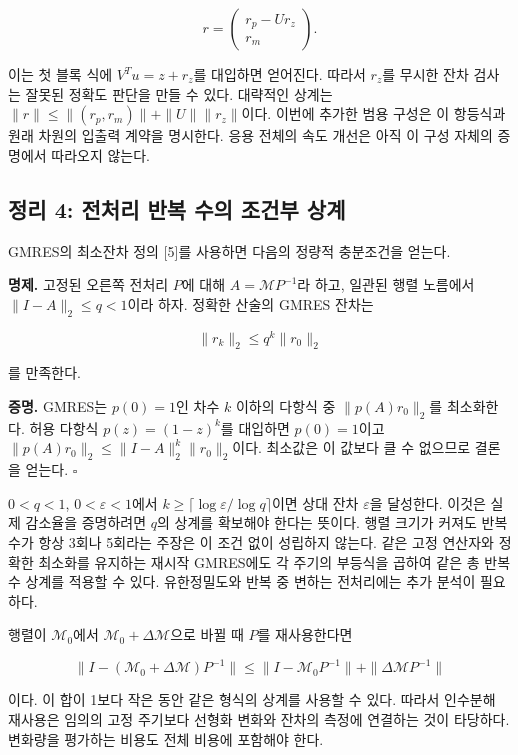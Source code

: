 \documentclass[
  10pt,
  a4paper,
]{article}
\begin{document}
\[
r=\begin{pmatrix}r_p-Ur_z\\r_m\end{pmatrix}.
\]

이는 첫 블록 식에 \(V^Tu=z+r_z\)를 대입하면 얻어진다. 따라서 \(r_z\)를
무시한 잔차 검사는 잘못된 정확도 판단을 만들 수 있다. 대략적인 상계는
\(\|r\|\le\|(r_p,r_m)\|+\|U\|\|r_z\|\)이다. 이번에 추가한 범용 구성은 이
항등식과 원래 차원의 입출력 계약을 명시한다. 응용 전체의 속도 개선은
아직 이 구성 자체의 증명에서 따라오지 않는다.

\hypertarget{uxc815uxb9ac-4-uxc804uxcc98uxb9ac-uxbc18uxbcf5-uxc218uxc758-uxc870uxac74uxbd80-uxc0c1uxacc4}{%
\subsection{정리 4: 전처리 반복 수의 조건부
상계}\label{uxc815uxb9ac-4-uxc804uxcc98uxb9ac-uxbc18uxbcf5-uxc218uxc758-uxc870uxac74uxbd80-uxc0c1uxacc4}}

GMRES의 최소잔차 정의 {[}5{]}를 사용하면 다음의 정량적 충분조건을
얻는다.

\textbf{명제.} 고정된 오른쪽 전처리 \(P\)에 대해
\(A=\mathcal MP^{-1}\)라 하고, 일관된 행렬 노름에서
\(\|I-A\|_2\le q<1\)이라 하자. 정확한 산술의 GMRES 잔차는

\[
\|r_k\|_2\le q^k\|r_0\|_2
\]

를 만족한다.

\textbf{증명.} GMRES는 \(p(0)=1\)인 차수 \(k\) 이하의 다항식 중
\(\|p(A)r_0\|_2\)를 최소화한다. 허용 다항식 \(p(z)=(1-z)^k\)를 대입하면
\(p(0)=1\)이고 \(\|p(A)r_0\|_2\le\|I-A\|_2^k\|r_0\|_2\)이다. 최소값은 이
값보다 클 수 없으므로 결론을 얻는다. \(\square\)

\(0<q<1\), \(0<\varepsilon<1\)에서
\(k\ge\lceil\log\varepsilon/\log q\rceil\)이면 상대 잔차
\(\varepsilon\)을 달성한다. 이것은 실제 감소율을 증명하려면 \(q\)의
상계를 확보해야 한다는 뜻이다. 행렬 크기가 커져도 반복 수가 항상 3회나
5회라는 주장은 이 조건 없이 성립하지 않는다. 같은 고정 연산자와 정확한
최소화를 유지하는 재시작 GMRES에도 각 주기의 부등식을 곱하여 같은 총
반복수 상계를 적용할 수 있다. 유한정밀도와 반복 중 변하는 전처리에는
추가 분석이 필요하다.

행렬이 \(\mathcal M_0\)에서 \(\mathcal M_0+\Delta\mathcal M\)으로 바뀔
때 \(P\)를 재사용한다면

\[
\|I-(\mathcal M_0+\Delta\mathcal M)P^{-1}\|
\le\|I-\mathcal M_0P^{-1}\|+\|\Delta\mathcal MP^{-1}\|
\]

이다. 이 합이 1보다 작은 동안 같은 형식의 상계를 사용할 수 있다. 따라서
인수분해 재사용은 임의의 고정 주기보다 선형화 변화와 잔차의 측정에
연결하는 것이 타당하다. 변화량을 평가하는 비용도 전체 비용에 포함해야
한다.
\end{document}
